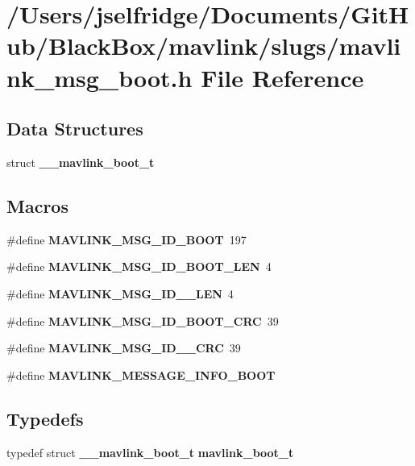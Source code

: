 \section{/\+Users/jselfridge/\+Documents/\+Git\+Hub/\+Black\+Box/mavlink/slugs/mavlink\+\_\+msg\+\_\+boot.h File Reference}
\label{mavlink__msg__boot_8h}
\subsection*{Data Structures}
\begin{DoxyCompactItemize}
\item 
struct \textbf{ \+\_\+\+\_\+mavlink\+\_\+boot\+\_\+t}
\end{DoxyCompactItemize}
\subsection*{Macros}
\begin{DoxyCompactItemize}
\item 
\#define \textbf{ M\+A\+V\+L\+I\+N\+K\+\_\+\+M\+S\+G\+\_\+\+I\+D\+\_\+\+B\+O\+OT}~197
\item 
\#define \textbf{ M\+A\+V\+L\+I\+N\+K\+\_\+\+M\+S\+G\+\_\+\+I\+D\+\_\+\+B\+O\+O\+T\+\_\+\+L\+EN}~4
\item 
\#define \textbf{ M\+A\+V\+L\+I\+N\+K\+\_\+\+M\+S\+G\+\_\+\+I\+D\+\_\+\_\+\+L\+EN}~4
\item 
\#define \textbf{ M\+A\+V\+L\+I\+N\+K\+\_\+\+M\+S\+G\+\_\+\+I\+D\+\_\+\+B\+O\+O\+T\+\_\+\+C\+RC}~39
\item 
\#define \textbf{ M\+A\+V\+L\+I\+N\+K\+\_\+\+M\+S\+G\+\_\+\+I\+D\+\_\+\_\+\+C\+RC}~39
\item 
\#define \textbf{ M\+A\+V\+L\+I\+N\+K\+\_\+\+M\+E\+S\+S\+A\+G\+E\+\_\+\+I\+N\+F\+O\+\_\+\+B\+O\+OT}
\end{DoxyCompactItemize}
\subsection*{Typedefs}
\begin{DoxyCompactItemize}
\item 
typedef struct \textbf{ \+\_\+\+\_\+mavlink\+\_\+boot\+\_\+t} \textbf{ mavlink\+\_\+boot\+\_\+t}
\end{DoxyCompactItemize}


